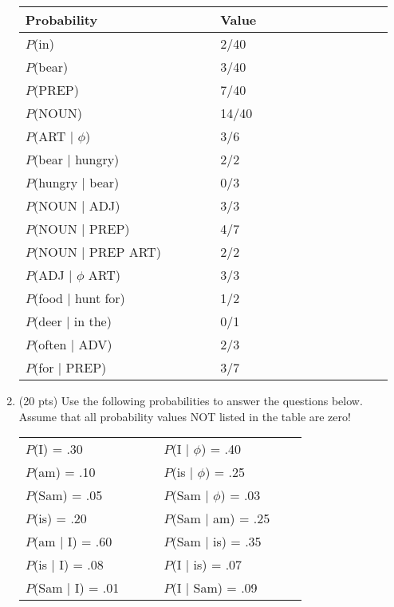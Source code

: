 \documentclass[11pt]{article}
\begin{document}
\begin{enumerate}
 \begin{center}
 \begin{tabular}{|l|l|} \hline
 \textbf{Probability~~~~~~~~~~~~~~~} & \textbf{Value~~~~~~~~~~~~~~~~~} \\ \hline
   $P$(in) & 2/40\\ \hline
   $P$(bear) & 3/40 \\ \hline
   $P$(PREP) & 7/40 \\ \hline
   $P$(NOUN) &  14/40 \\ \hline
   $P$(ART $\mid$ $\phi$) & 3/6 \\ \hline
   $P$(bear $\mid$ hungry) & 2/2 \\ \hline
   $P$(hungry $\mid$ bear) & 0/3 \\ \hline
   $P$(NOUN $\mid$ ADJ) & 3/3 \\ \hline
   $P$(NOUN $\mid$ PREP) & 4/7 \\ \hline
   $P$(NOUN $\mid$ PREP ART) & 2/2 \\ \hline
   $P$(ADJ $\mid$ $\phi$ ART) & 3/3 \\ \hline
   $P$(food $\mid$ hunt for) & 1/2 \\ \hline
   $P$(deer $\mid$ in the) & 0/1 \\ \hline
   $P$(often $\mid$ ADV) & 2/3 \\ \hline
   $P$(for $\mid$ PREP) & 3/7 \\   \hline
 \end{tabular}
 \end{center}



\newpage
\item (20 pts) Use the following probabilities to answer the questions
  below.  Assume that all probability values NOT listed in the table are zero!

\begin{center}
  \begin{tabular}{|ll|ll|} \hline
    $P$(I) = .30 & $P$(I $\mid$ $\phi$) = .40 \\
    $P$(am) = .10 &  $P$(is $\mid$ $\phi$) = .25 \\
    $P$(Sam) = .05 & $P$(Sam $\mid$ $\phi$) = .03 \\
    $P$(is) = .20 &     $P$(Sam $\mid$ am) = .25 \\
    $P$(am $\mid$ I) = .60 &     $P$(Sam $\mid$ is) = .35 \\
    $P$(is $\mid$ I) = .08 &   $P$(I $\mid$ is) = .07 \\
    $P$(Sam $\mid$ I) = .01~~~~~ &    $P$(I $\mid$ Sam) = .09 \\ \hline 
\end{tabular}
\end{center}


\end{enumerate}
\end{document}
